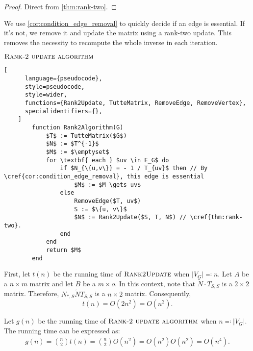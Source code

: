 \begin{proof}
    Direct from \cref{thm:rank-two}. 
\end{proof}

We use \cref{cor:condition_edge_removal} to quickly decide if an edge is essential. 
If it's not, we remove it and update the matrix using a rank-two update. 
This removes the necessity to recompute the whole inverse in each iteration.

\begin{programruledcaption}{\(\textsc{Rank-2 update algorithm}\)}
    \begin{lstlisting}[
      language={pseudocode},
      style=pseudocode,
      style=wider,
      functions={Rank2Update, TutteMatrix, RemoveEdge, RemoveVertex},
      specialidentifiers={},
    ]
        function Rank2Algorithm(G)
            $T$ := TutteMatrix($G$)
            $N$ := $T^{-1}$
            $M$ := $\emptyset$
            for \textbf{ each } $uv \in E_G$ do
                if $N_{\{u,v\}} = - 1 / T_{uv}$ then // By \cref{cor:condition_edge_removal}, this edge is essential
                    $M$ := $M \gets uv$
                else 
                    RemoveEdge($T, uv$)
                    S := $\{u, v\}$
                    $N$ := Rank2Update($S, T, N$) // \cref{thm:rank-two}.
                end
            end
            return $M$
        end
    \end{lstlisting}
\end{programruledcaption}

First, let \(t(n)\) be the running time of \(\textsc{Rank2Update}\) when \(|V_G| \eqcolon n\).
Let \(A\) be a \(n \times m\) matrix and let \(B\) be a \(m \times o\).
In this context, note that \(\tilde{N} \cdot T_{S, S}\) is a \(2 \times 2\) matrix.
Therefore, \(N_{*, S}\tilde{N}T_{S, S}\) is a \(n \times 2\) matrix.
Consequently,
\[
    t(n) = O(2n^2) = O(n^2).
\]

Let \(g(n)\) be the running time of \(\textsc{Rank-2 update algorithm}\) when \(n \eqcolon |V_G|\).
The running time can be expressed as:
\begin{align*}
    g(n) = \binom{n}{2} t(n) = \binom{n}{2} O(n^2) = O(n^2) O(n^2) = O(n^4).
\end{align*}